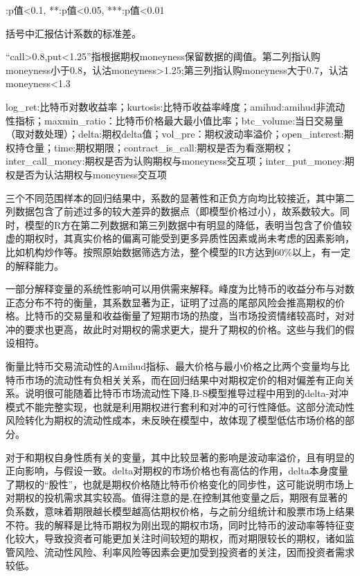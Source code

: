 {\begin{center}
\begin{threeparttable}[H]
\begin{tablenotes}
\footnotesize
\item *:p值<0.1, **:p值<0.05, ***:p值<0.01
\item 括号中汇报估计系数的标准差。
\item “call>0.8,put<1.25”指根据期权moneyness保留数据的阈值。第二列指认购moneyness小于0.8，认沽moneyness>1.25;第三列指认购moneyness大于0.7，认沽moneyness<1.3
\item log\_ret:比特币对数收益率；kurtosis:比特币收益率峰度；amihud:amihud非流动性指标；maxmin\_ratio：比特币价格最大最小值比率；btc\_volume:当日交易量（取对数处理）；delta:期权delta值；vol\_pre：期权波动率溢价；open\_interest:期权持仓量；time:期权期限；contract\_is\_call:期权是否为看涨期权；inter\_call\_money:期权是否为认购期权与moneyness交互项；inter\_put\_money:期权是否为认沽期权与moneyness交互项
\end{tablenotes}
\end{threeparttable}
\end{center}
\newpage
\restoregeometry
\par{三个不同范围样本的回归结果中，系数的显著性和正负方向均比较接近，其中第二列数据包含了前述过多的较大差异的数据点（即模型价格过小），故系数较大。同时，模型的R方在第二列数据和第三列数据中有明显的降低，表明当包含了价值较虚的期权时，其真实价格的偏离可能受到更多异质性因素或尚未考虑的因素影响，比如机构炒作等。按照原始数据筛选方法，整个模型的R方达到60$\%$以上，有一定的解释能力。}
\par{
一部分解释变量的系统性影响可以用供需来解释。峰度为比特币的收益分布与对数正态分布不符的衡量，其系数显著为正，证明了过高的尾部风险会推高期权的价格。比特币的交易量和收益衡量了短期市场的热度，当市场投资情绪较高时，对对冲的要求也更高，故此时对期权的需求更大，提升了期权的价格。这些与我们的假设相符。}
\par{衡量比特币交易流动性的Amihud指标、最大价格与最小价格之比两个变量均与比特币市场的流动性有负相关关系，而在回归结果中对期权定价的相对偏差有正向关系。说明很可能随着比特币市场流动性下降,B-S模型推导过程中用到的delta-对冲模式不能完整实现，也就是利用期权进行套利和对冲的可行性降低。这部分流动性风险转化为期权的流动性成本，未反映在模型中，故体现了模型低估市场价格的部分。
}
\par{对于和期权自身性质有关的变量，其中比较显著的影响是波动率溢价，且有明显的正向影响，与假设一致。delta对期权的市场价格也有高估的作用，delta本身度量了期权的“股性”，也就是期权价格随比特币价格变化的同步性，这可能说明市场上对期权的投机需求其实较高。值得注意的是,在控制其他变量之后，期限有显著的负系数，意味着期限越长模型越高估期权价格，与之前分组统计和股票市场上结果不符。我的解释是比特币期权为刚出现的期权市场，同时比特币的波动率等特征变化较大，导致投资者可能更加关注时间较短的期权，而对期限较长的期权，诸如监管风险、流动性风险、利率风险等因素会更加受到投资者的关注，因而投资者需求较低。}
}

